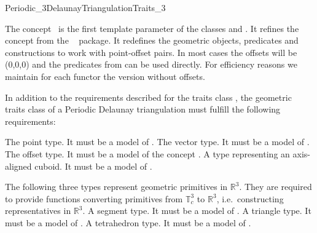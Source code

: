 

\begin{ccRefConcept}{Periodic_3DelaunayTriangulationTraits_3}

\ccDefinition
The concept \ccRefName\ is the first template parameter of the classes
 and
. It refines the concept
 from the \cgal\  package.
It redefines the geometric objects, predicates and constructions to
work with point-offset pairs. In most cases the offsets will be
(0,0,0) and the predicates from 
can be used directly. For efficiency reasons we maintain for each
functor the version without offsets.

\ccRefines {}

In addition to the requirements described for the traits class
, the geometric traits class of a
Periodic Delaunay triangulation must fulfill the following
requirements:


\ccTypes
{}

{The point type. It must be a model of . }
\ccGlue
{} {The vector type. It must be a model of
  .}
\ccGlue
{} {The offset type. It must be a
  model of the concept .}
\ccGlue
{} {A type representing an axis-aligned
  cuboid. It must be a model of .}

The following three types represent geometric primitives in $\mathbb
R^3$. They are required to provide functions converting primitives
from $\mathbb T_c^3$ to $\mathbb R^3$, i.e.\ constructing
representatives in $\mathbb R^3$.
 {A segment type. It must be a model of .}
\ccGlue
{} {A triangle type. It must be a model of
  . }
\ccGlue
{} {A tetrahedron type. It must be a model
of . }



\end{ccRefConcept}
